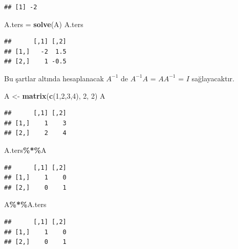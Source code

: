 \documentclass[
]{book}
\newenvironment{Shaded}{\begin{snugshade}}{\end{snugshade}}
\newcommand{\DecValTok}[1]{\textcolor[rgb]{0.00,0.00,0.81}{#1}}
\newcommand{\FunctionTok}[1]{\textcolor[rgb]{0.13,0.29,0.53}{\textbf{#1}}}
\newcommand{\NormalTok}[1]{#1}
\newcommand{\OtherTok}[1]{\textcolor[rgb]{0.56,0.35,0.01}{#1}}
\newcommand{\SpecialCharTok}[1]{\textcolor[rgb]{0.81,0.36,0.00}{\textbf{#1}}}
\begin{document}
\begin{verbatim}
## [1] -2
\end{verbatim}

\begin{Shaded}
\begin{Highlighting}[]
\NormalTok{ A.ters }\OtherTok{=} \FunctionTok{solve}\NormalTok{(A)}
\NormalTok{ A.ters}
\end{Highlighting}
\end{Shaded}

\begin{verbatim}
##      [,1] [,2]
## [1,]   -2  1.5
## [2,]    1 -0.5
\end{verbatim}

Bu şartlar altında hesaplanacak \(A^{-1}\) de \(A^{-1}A\) = \(AA^{-1}\) = \(I\) sağlayacaktır.

\begin{Shaded}
\begin{Highlighting}[]
\NormalTok{ A }\OtherTok{\textless{}{-}} \FunctionTok{matrix}\NormalTok{(}\FunctionTok{c}\NormalTok{(}\DecValTok{1}\NormalTok{,}\DecValTok{2}\NormalTok{,}\DecValTok{3}\NormalTok{,}\DecValTok{4}\NormalTok{), }\DecValTok{2}\NormalTok{, }\DecValTok{2}\NormalTok{) }
\NormalTok{ A }
\end{Highlighting}
\end{Shaded}

\begin{verbatim}
##      [,1] [,2]
## [1,]    1    3
## [2,]    2    4
\end{verbatim}

\begin{Shaded}
\begin{Highlighting}[]
\NormalTok{ A.ters}\SpecialCharTok{\%*\%}\NormalTok{A }
\end{Highlighting}
\end{Shaded}

\begin{verbatim}
##      [,1] [,2]
## [1,]    1    0
## [2,]    0    1
\end{verbatim}

\begin{Shaded}
\begin{Highlighting}[]
\NormalTok{ A}\SpecialCharTok{\%*\%}\NormalTok{A.ters }
\end{Highlighting}
\end{Shaded}

\begin{verbatim}
##      [,1] [,2]
## [1,]    1    0
## [2,]    0    1
\end{verbatim}
\end{document}
